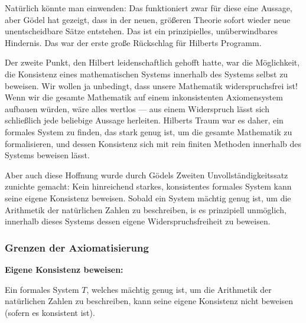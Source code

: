 \begin{spoken-clean}[01:01:38 - 01:03:50]
Natürlich könnte man einwenden:  Das funktioniert zwar für diese eine Aussage, aber Gödel hat gezeigt, dass in der neuen, größeren Theorie sofort wieder neue unentscheidbare Sätze entstehen. Das ist ein prinzipielles, unüberwindbares Hindernis. Das war der erste große Rückschlag für Hilberts Programm.

Der zweite Punkt, den Hilbert leidenschaftlich gehofft hatte, war die Möglichkeit, die Konsistenz eines mathematischen Systems innerhalb des Systems selbst zu beweisen. Wir wollen ja unbedingt, dass unsere Mathematik widerspruchsfrei ist! Wenn wir die gesamte Mathematik auf einem inkonsistenten Axiomensystem aufbauen würden, wäre alles wertlos --- aus einem Widerspruch lässt sich schließlich jede beliebige Aussage herleiten. Hilberts Traum war es daher, ein formales System zu finden, das stark genug ist, um die gesamte Mathematik zu formalisieren, und dessen Konsistenz sich mit rein finiten Methoden innerhalb des Systems beweisen lässt.

Aber auch diese Hoffnung wurde durch Gödels Zweiten Unvollständigkeitssatz zunichte gemacht: Kein hinreichend starkes, konsistentes formales System kann seine eigene Konsistenz beweisen. Sobald ein System mächtig genug ist, um die Arithmetik der natürlichen Zahlen zu beschreiben, is es prinzipiell unmöglich, innerhalb dieses Systems dessen eigene Widerspruchsfreiheit zu beweisen.
\end{spoken-clean}

\subsubsection{Grenzen der Axiomatisierung}
\begin{math-stroke}
\textbf{Eigene Konsistenz beweisen:}

Ein formales System $T$, welches mächtig genug ist, um die Arithmetik der natürlichen Zahlen zu beschreiben, kann seine eigene Konsistenz nicht beweisen (sofern es konsistent ist).
\end{math-stroke}

\begin{ai-global-state-checkpoint-invisible-content}
\end{ai-global-state-checkpoint-invisible-content}


